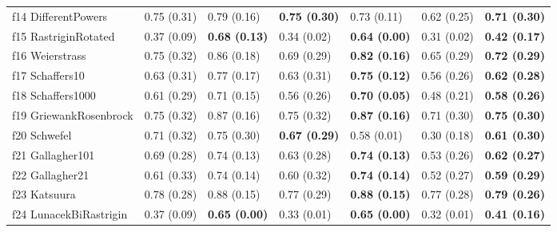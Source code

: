 \begin{table}
\begin{tabular}{lllllll}
f14 DifferentPowers & 0.75 (0.31) & 0.79 (0.16) & \textbf{0.75 (0.30)} & 0.73 (0.11) & 0.62 (0.25) & \textbf{0.71 (0.30)} \\
f15 RastriginRotated & 0.37 (0.09) & \textbf{0.68 (0.13)} & 0.34 (0.02) & \textbf{0.64 (0.00)} & 0.31 (0.02) & \textbf{0.42 (0.17)} \\
f16 Weierstrass & 0.75 (0.32) & 0.86 (0.18) & 0.69 (0.29) & \textbf{0.82 (0.16)} & 0.65 (0.29) & \textbf{0.72 (0.29)} \\
f17 Schaffers10 & 0.63 (0.31) & 0.77 (0.17) & 0.63 (0.31) & \textbf{0.75 (0.12)} & 0.56 (0.26) & \textbf{0.62 (0.28)} \\
f18 Schaffers1000 & 0.61 (0.29) & 0.71 (0.15) & 0.56 (0.26) & \textbf{0.70 (0.05)} & 0.48 (0.21) & \textbf{0.58 (0.26)} \\
f19 GriewankRosenbrock & 0.75 (0.32) & 0.87 (0.16) & 0.75 (0.32) & \textbf{0.87 (0.16)} & 0.71 (0.30) & \textbf{0.75 (0.30)} \\
f20 Schwefel & 0.71 (0.32) & 0.75 (0.30) & \textbf{0.67 (0.29)} & 0.58 (0.01) & 0.30 (0.18) & \textbf{0.61 (0.30)} \\
f21 Gallagher101 & 0.69 (0.28) & 0.74 (0.13) & 0.63 (0.28) & \textbf{0.74 (0.13)} & 0.53 (0.26) & \textbf{0.62 (0.27)} \\
f22 Gallagher21 & 0.61 (0.33) & 0.74 (0.14) & 0.60 (0.32) & \textbf{0.74 (0.14)} & 0.52 (0.27) & \textbf{0.59 (0.29)} \\
f23 Katsuura & 0.78 (0.28) & 0.88 (0.15) & 0.77 (0.29) & \textbf{0.88 (0.15)} & 0.77 (0.28) & \textbf{0.79 (0.26)} \\
f24 LunacekBiRastrigin & 0.37 (0.09) & \textbf{0.65 (0.00)} & 0.33 (0.01) & \textbf{0.65 (0.00)} & 0.32 (0.01) & \textbf{0.41 (0.16)} \\
\bottomrule
\end{tabular}
\end{table}
